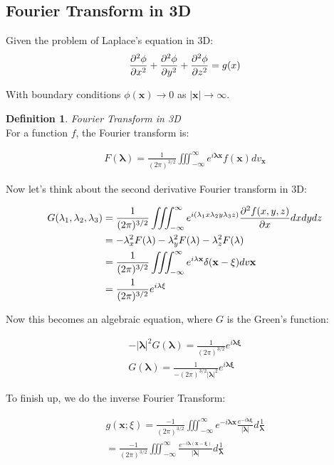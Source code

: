 \documentclass{article}
\theoremstyle{definition}
\newtheorem{definition}{Definition}[section]
\newcommand{\Def}[2]{
\begin{shaded*}
\begin{definition}{\textit{#1}}\\#2\end{definition}
\end{shaded*}
}
\begin{document}
\subsection{Fourier Transform in 3D}
Given the problem of Laplace's equation in 3D:
\begin{align*}
\pdv{^2\phi}{x^2} + \pdv{^2\phi}{y^2} + \pdv{^2\phi}{z^2} = g(x)
\end{align*}

With boundary conditions $\phi(\mathbf{x}) \to 0$ as $|\mathbf{x}| \to \infty$. 

\Def{Fourier Transform in 3D}{
For a function $f$, the Fourier transform is:

\begin{align*}
F(\mathbf{\lambda}) = \frac{1}{(2 \pi)^{3/2}} \iiint_{-\infty}^\infty e^{i \mathbf{\lambda x}} f(\mathbf{x}) dv_\mathbf{x}
\end{align*}
}

Now let's think about the second derivative Fourier transform in 3D:

\begin{align*}
G(\lambda_1, \lambda_2, \lambda_3) &= \frac{1}{(2 \pi)^{3/2}} \iiint_{-\infty}^\infty e^{i (\lambda_1 x \lambda_2 y \lambda_3 z)} \pdv{^2 f(x,y,z)}{x} dxdydz \\ 
&= -\lambda_x^2 F(\mathbf{\lambda}) -\lambda_y^2 F(\mathbf{\lambda}) -\lambda_z^2 F(\mathbf{\lambda}) \\
&= \frac{1}{(2 \pi)^{3/2}} \iiint_{-\infty}^\infty e^{i \mathbf{\lambda x}} \delta(\mathbf{x} - \mathbf{\xi}) dv\mathbf{x} \\ 
& = \frac{1}{(2 \pi)^{3/2}} e^{i \mathbf{\lambda \xi}}
\end{align*}

Now this becomes an algebraic equation, where $G$ is the Green's function:

\begin{align*}
-|\mathbf{\lambda}|^2 G(\mathbf{\mathbf{\lambda}}) = \frac{1}{(2 \pi)^{3/2}}  e^{i \mathbf{\lambda \xi}} \\
G(\mathbf{\lambda}) = \frac{1}{-(2 \pi)^{3/2}|\mathbf{\lambda}|^2}  e^{i \mathbf{\lambda \xi}} 
\end{align*}

To finish up, we do the inverse Fourier Transform:

\begin{align*}
g(\mathbf{x};\xi) = \frac{-1}{(2 \pi)^{3/2}} \iiint_{-\infty}^\infty e^{-i  \mathbf{\lambda x}} \frac{e^{-i  \mathbf{\lambda \xi}}}{|\mathbf{\lambda}|} d\frac{1}{\mathbf{\lambda}} \\ 
= \frac{-1}{(2 \pi)^{3/2}} \iiint_{-\infty}^\infty \frac{e^{-i  \mathbf{\lambda} (\mathbf{x} - \mathbf{\xi})}}{|\mathbf{\lambda}|} d\frac{1}{\mathbf{\lambda}} \\ 
\end{align*}
\end{document}
